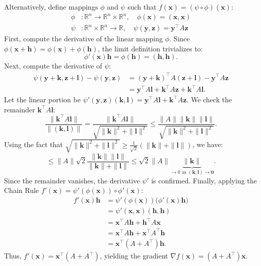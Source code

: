 \documentclass[12pt]{article}
\begin{document}
\begin{pfbox}
Alternatively, define mappings $\phi$ and $\psi$ such that $f(\mathbf{x}) = (\psi \circ \phi)(\mathbf{x})$:
\begin{align*}
    \phi &: \mathbb{R}^n \to \mathbb{R}^n \times \mathbb{R}^n, \quad \phi(\mathbf{x}) = (\mathbf{x}, \mathbf{x}) \\
    \psi &: \mathbb{R}^n \times \mathbb{R}^n \to \mathbb{R}, \quad \psi(\mathbf{y}, \mathbf{z}) = \mathbf{y}^\top A \mathbf{z}
\end{align*}
First, compute the derivative of the linear mapping $\phi$. Since $\phi(\mathbf{x} + \mathbf{h}) = \phi(\mathbf{x}) + \phi(\mathbf{h})$, the limit definition trivializes to:
$$ \phi'(\mathbf{x})\mathbf{h} = \phi(\mathbf{h}) = (\mathbf{h}, \mathbf{h}). $$
Next, compute the derivative of $\psi$:
\begin{align*}
    \psi(\mathbf{y} + \mathbf{k}, \mathbf{z} + \mathbf{l}) - \psi(\mathbf{y}, \mathbf{z}) &= (\mathbf{y} + \mathbf{k})^\top A (\mathbf{z} + \mathbf{l}) - \mathbf{y}^\top A \mathbf{z} \\
    &= \mathbf{y}^\top A \mathbf{l} + \mathbf{k}^\top A \mathbf{z} + \mathbf{k}^\top A \mathbf{l}.
\end{align*}
Let the linear portion be $\psi'(\mathbf{y}, \mathbf{z})(\mathbf{k}, \mathbf{l}) = \mathbf{y}^\top A \mathbf{l} + \mathbf{k}^\top A \mathbf{z}$. We check the remainder $\mathbf{k}^\top A \mathbf{l}$:
$$ \frac{\|\mathbf{k}^\top A \mathbf{l}\|}{\|(\mathbf{k}, \mathbf{l})\|} = \frac{\|\mathbf{k}^\top A \mathbf{l}\|}{\sqrt{\|\mathbf{k}\|^2 + \|\mathbf{l}\|^2}} \le \frac{\|A\| \|\mathbf{k}\| \|\mathbf{l}\|}{\sqrt{\|\mathbf{k}\|^2 + \|\mathbf{l}\|^2}}. $$
Using the fact that $\sqrt{\|\mathbf{k}\|^2 + \|\mathbf{l}\|^2} \ge \frac{1}{\sqrt{2}}(\|\mathbf{k}\| + \|\mathbf{l}\|)$, we have:
$$ \le \|A\|\sqrt{2} \frac{\|\mathbf{k}\| \|\mathbf{l}\|}{\|\mathbf{k}\| + \|\mathbf{l}\|} \le \sqrt{2}\|A\| \underbrace{\|\mathbf{k}\|}_{\to 0 \text{ as } (\mathbf{k},\mathbf{l}) \to \mathbf{0}}. $$
Since the remainder vanishes, the derivative $\psi'$ is confirmed.
Finally, applying the Chain Rule $f'(\mathbf{x}) = \psi'(\phi(\mathbf{x})) \circ \phi'(\mathbf{x})$:
\begin{align*}
    f'(\mathbf{x})\mathbf{h} &= \psi'(\phi(\mathbf{x}))\big(\phi'(\mathbf{x})\mathbf{h}\big) \\
    &= \psi'(\mathbf{x}, \mathbf{x})(\mathbf{h}, \mathbf{h}) \\
    &= \mathbf{x}^\top A \mathbf{h} + \mathbf{h}^\top A \mathbf{x} \\
    &= \mathbf{x}^\top A \mathbf{h} + \mathbf{x}^\top A^\top \mathbf{h} \\
    &= \mathbf{x}^\top(A + A^\top)\mathbf{h}.
\end{align*}
Thus, $f'(\mathbf{x}) = \mathbf{x}^\top(A + A^\top)$, yielding the gradient $\nabla f(\mathbf{x}) = (A + A^\top)\mathbf{x}$.\\


\end{pfbox}
\end{document}
